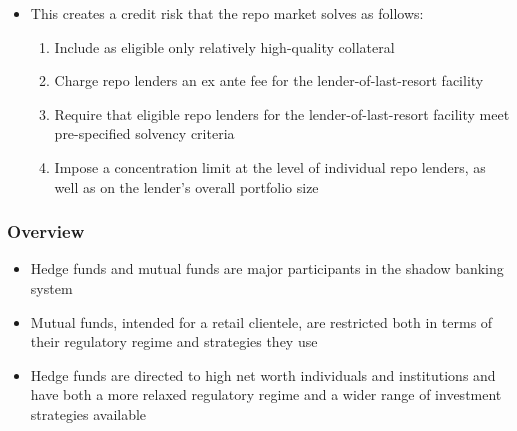\documentclass[11pt]{beamer}
\begin{document}
\begin{frame}
\begin{itemize}
\item This creates a credit risk that the repo market solves as follows:
\begin{enumerate}
\item Include as eligible only relatively high-quality collateral
\item Charge repo lenders an ex ante fee for the lender-of-last-resort facility
\item Require that eligible repo lenders for the lender-of-last-resort facility meet pre-specified solvency criteria
\item Impose a concentration limit at the level of individual repo lenders, as well as on the lender’s overall portfolio size
\end{enumerate}
\end{itemize}
\end{frame}
\begin{frame}
\begin{center}
\end{center}
\end{frame}


\begin{frame}
\frametitle{Overview}
\begin{itemize}
\item Hedge funds and mutual funds are major participants in the shadow banking system
\item Mutual funds, intended for a retail clientele, are restricted both in terms of their regulatory regime and strategies they use
\item Hedge funds are directed to high net worth individuals and institutions and have both a more relaxed regulatory regime and a wider range of investment strategies available
\end{itemize}
\end{frame}
\end{document}
